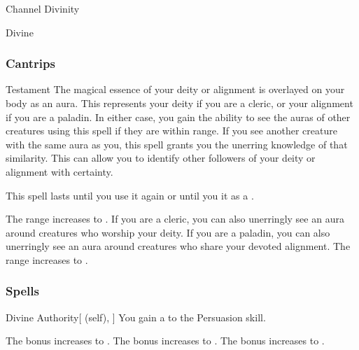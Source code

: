 \newpage
\begin{spellsection}{Channel Divinity}

\begin{spellheader}
\end{spellheader}


 Divine

\subsubsection{Cantrips}


\begin{freeability}{Testament}
The magical essence of your deity or alignment is overlayed on your body as an aura.
This represents your deity if you are a cleric, or your alignment if you are a paladin.
In either case, you gain the ability to see the auras of other creatures using this spell if they are within \rngclose range.
If you see another creature with the same aura as you, this spell grants you the unerring knowledge of that similarity.
This can allow you to identify other followers of your deity or alignment with certainty.

This spell lasts until you use it again or until you  it as a .

\rankline
{} The range increases to \rngmed.
 If you are a cleric, you can also unerringly see an aura around creatures who worship your deity.
If you are a paladin, you can also unerringly see an aura around creatures who share your devoted alignment.
 The range increases to \rngext.
\end{freeability}

\end{spellsection}


\subsubsection{Spells}


\lowercase{\hypertarget{spell:Divine Authority}{}}\label{spell:Divine Authority}
\begin{attuneability}[Rank 1]{\hypertarget{spell:Divine Authority}{Divine Authority}}[ (self), ]
You gain a   to the Persuasion skill.

\rankline
{} The bonus increases to .
 The bonus increases to .
 The bonus increases to .
\end{attuneability}
\vspace{0.25em}



